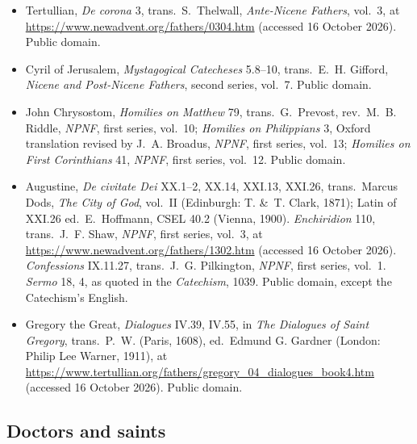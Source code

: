 {\fontsize{8.6}{9.6}\selectfont
\begin{itemize}[itemsep=0pt,parsep=0pt,topsep=0.05em]
\item Tertullian, \emph{De corona} 3, trans.\ S.~Thelwall, \emph{Ante-Nicene Fathers}, vol.~3, at \url{https://www.newadvent.org/fathers/0304.htm} (accessed 16 October 2026). Public domain.
\item Cyril of Jerusalem, \emph{Mystagogical Catecheses} 5.8--10, trans.\ E.~H. Gifford, \emph{Nicene and Post-Nicene Fathers}, second series, vol.~7. Public domain.
\item John Chrysostom, \emph{Homilies on Matthew} 79, trans.\ G.~Prevost, rev.\ M.~B. Riddle, \emph{NPNF}, first series, vol.~10; \emph{Homilies on Philippians} 3, Oxford translation revised by J.~A. Broadus, \emph{NPNF}, first series, vol.~13; \emph{Homilies on First Corinthians} 41, \emph{NPNF}, first series, vol.~12. Public domain.
\item Augustine, \emph{De civitate Dei} XX.1--2, XX.14, XXI.13, XXI.26, trans.\ Marcus Dods, \emph{The City of God}, vol.~II (Edinburgh: T. \&\ T. Clark, 1871); Latin of XXI.26 ed.\ E.~Hoffmann, CSEL 40.2 (Vienna, 1900). \emph{Enchiridion} 110, trans.\ J.~F. Shaw, \emph{NPNF}, first series, vol.~3, at \url{https://www.newadvent.org/fathers/1302.htm} (accessed 16 October 2026). \emph{Confessions} IX.11.27, trans.\ J.~G. Pilkington, \emph{NPNF}, first series, vol.~1. \emph{Sermo} 18, 4, as quoted in the \emph{Catechism}, 1039. Public domain, except the Catechism's English.
\item Gregory the Great, \emph{Dialogues} IV.39, IV.55, in \emph{The Dialogues of Saint Gregory}, trans.\ P.~W. (Paris, 1608), ed.\ Edmund G. Gardner (London: Philip Lee Warner, 1911), at \url{https://www.tertullian.org/fathers/gregory_04_dialogues_book4.htm} (accessed 16 October 2026). Public domain.
\end{itemize}}

\subsection*{Doctors and saints}

